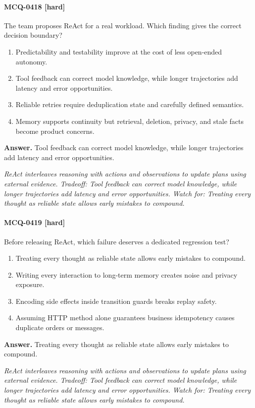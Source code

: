 \paragraph{MCQ-0418 [hard]} The team proposes ReAct for a real workload. Which finding gives the correct decision boundary?
\begin{enumerate}[label=\Alph*.]
\item Predictability and testability improve at the cost of less open-ended autonomy.
\item Tool feedback can correct model knowledge, while longer trajectories add latency and error opportunities.
\item Reliable retries require deduplication state and carefully defined semantics.
\item Memory supports continuity but retrieval, deletion, privacy, and stale facts become product concerns.
\end{enumerate}
\noindent\textbf{Answer.} Tool feedback can correct model knowledge, while longer trajectories add latency and error opportunities.
\par\textit{ReAct interleaves reasoning with actions and observations to update plans using external evidence. Tradeoff: Tool feedback can correct model knowledge, while longer trajectories add latency and error opportunities. Watch for: Treating every thought as reliable state allows early mistakes to compound.}
\paragraph{MCQ-0419 [hard]} Before releasing ReAct, which failure deserves a dedicated regression test?
\begin{enumerate}[label=\Alph*.]
\item Treating every thought as reliable state allows early mistakes to compound.
\item Writing every interaction to long-term memory creates noise and privacy exposure.
\item Encoding side effects inside transition guards breaks replay safety.
\item Assuming HTTP method alone guarantees business idempotency causes duplicate orders or messages.
\end{enumerate}
\noindent\textbf{Answer.} Treating every thought as reliable state allows early mistakes to compound.
\par\textit{ReAct interleaves reasoning with actions and observations to update plans using external evidence. Tradeoff: Tool feedback can correct model knowledge, while longer trajectories add latency and error opportunities. Watch for: Treating every thought as reliable state allows early mistakes to compound.}
